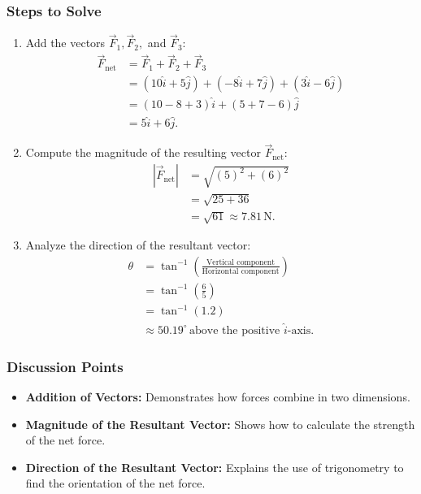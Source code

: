\documentclass{report}
\begin{document}
\subsubsection*{Steps to Solve}
\begin{enumerate}
    \item Add the vectors \( \vec{F}_1, \vec{F}_2, \) and \( \vec{F}_3 \):
    \begin{align*}
        \vec{F}_{\text{net}} &= \vec{F}_1 + \vec{F}_2 + \vec{F}_3 \\
        &= (10 \hat{i} + 5 \hat{j}) + (-8 \hat{i} + 7 \hat{j}) + (3 \hat{i} - 6 \hat{j}) \\
        &= (10 - 8 + 3) \hat{i} + (5 + 7 - 6) \hat{j} \\
        &= 5 \hat{i} + 6 \hat{j}.
    \end{align*}

    \item Compute the magnitude of the resulting vector \( \vec{F}_{\text{net}} \):
    \begin{align*}
        |\vec{F}_{\text{net}}| &= \sqrt{(5)^2 + (6)^2} \\
        &= \sqrt{25 + 36} \\
        &= \sqrt{61} \approx 7.81 \, \text{N}.
    \end{align*}

    \item Analyze the direction of the resultant vector:
    \begin{align*}
        \theta &= \tan^{-1} \left( \frac{\text{Vertical component}}{\text{Horizontal component}} \right) \\
        &= \tan^{-1} \left( \frac{6}{5} \right) \\
        &= \tan^{-1} (1.2) \\
        &\approx 50.19^\circ \, \text{above the positive } \hat{i} \text{-axis}.
    \end{align*}
\end{enumerate}

\subsubsection*{Discussion Points}
\begin{itemize}
    \item \textbf{Addition of Vectors:} Demonstrates how forces combine in two dimensions.
    \item \textbf{Magnitude of the Resultant Vector:} Shows how to calculate the strength of the net force.
    \item \textbf{Direction of the Resultant Vector:} Explains the use of trigonometry to find the orientation of the net force.
\end{itemize}
\end{document}
